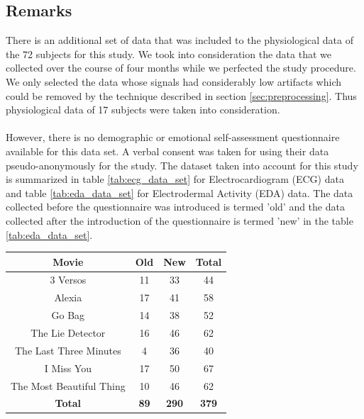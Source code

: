 \subsection{Remarks}
There is an additional set of data that was included to the physiological data of the 72 subjects for this study. We took into consideration the data that we collected over the course of four months while we perfected the study procedure. We only selected the data whose signals had considerably low artifacts which could be removed by the technique described in section \ref{sec:preprocessing}. Thus physiological data of 17 subjects were taken into consideration. 
\paragraph{}However, there is no demographic or emotional self-assessment questionnaire available for this data set. A verbal consent was taken for using their data pseudo-anonymously for the study. The dataset taken into account for this study is summarized in table \ref{tab:ecg_data_set} for Electrocardiogram (ECG) data and table \ref{tab:eda_data_set} for Electrodermal Activity (EDA) data. The data collected before the questionnaire was introduced is termed 'old' and the data collected after the introduction of the questionnaire is termed 'new' in the table \ref{tab:eda_data_set}.


\begin{center}
\begin{tabular}{ |c|c|c|c| }
\hline
Movie & Old & New & Total \\
\hline
\hline
3 Versos & 11 & 33 & 44 \\
\hline
Alexia & 17 & 41 & 58 \\
\hline
Go Bag & 14 & 38 & 52 \\
\hline
The Lie Detector & 16 & 46 & 62 \\
\hline
The Last Three Minutes & 4 & 36 & 40 \\
\hline
I Miss You & 17 & 50 & 67 \\
\hline
The Most Beautiful Thing & 10 & 46 & 62 \\
\hline
\textbf{Total} & \textbf{89} & \textbf{290} & \textbf{379} \\
\hline
\end{tabular}
\label{tab:ecg_data_set}
\end{center}

